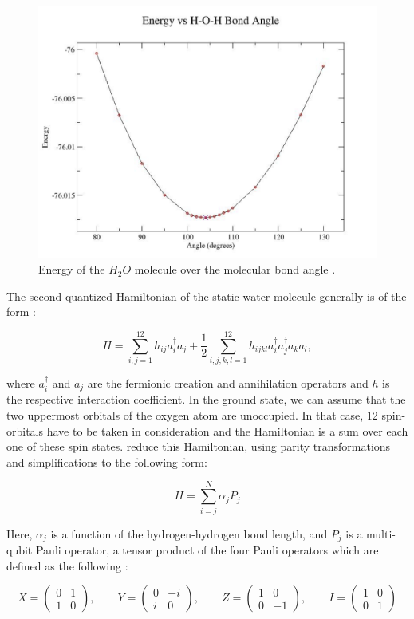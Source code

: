 \documentclass{article}
\begin{document}
\begin{figure}[htbp]
    \centering
    \includegraphics[scale=0.4]{h2oenergy.png}
    \caption{Energy of the $H_{2}O$ molecule over the molecular bond angle \cite{smith}.}
    \label{water}
\end{figure}

The second quantized Hamiltonian of the static water molecule generally is of the form \cite{bian}:

$$
H=\sum_{i, j=1}^{12} h_{i j} a_{i}^{\dagger} a_{j}+\frac{1}{2} \sum_{i, j, k, l=1}^{12} h_{i j k l} a_{i}^{\dagger} a_{j}^{\dagger} a_{k} a_{l},
$$

where $ a_{i}^{\dagger}$ and $a_{j}$ are the fermionic creation and annihilation operators and $ h $ is the respective interaction coefficient. In the ground state, we can assume that the two uppermost orbitals of the oxygen atom are unoccupied. In that case, 12 spin-orbitals have to be taken in consideration and the Hamiltonian is a sum over each one of these spin states.
\textcite{bian} reduce this Hamiltonian, using parity transformations and simplifications to the following form:

$$
H=\sum_{i=j}^{N} \alpha_{j} P_{j}
$$

Here, $\alpha_{j}$ is a function of the hydrogen-hydrogen bond length, and $ P_{j}$ is a multi-qubit Pauli operator, a tensor product of the four Pauli operators which are defined as the following \cite{malley}:


$$
X=\left(\begin{array}{cc}
0 & 1 \\
1 & 0
\end{array}\right), \quad \quad Y=\left(\begin{array}{cc}
0 & -i \\
i & 0
\end{array}\right), \quad \quad Z=\left(\begin{array}{cc}
1 & 0 \\
0 & -1
\end{array}\right),\quad \quad I=\left(\begin{array}{cc}
1 & 0 \\
0 & 1
\end{array}\right)
$$
\end{document}
